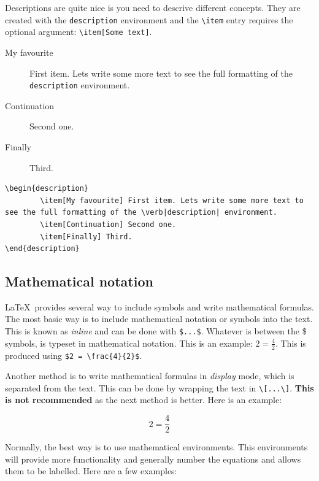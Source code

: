 Descriptions are quite nice is you need to descrive different concepts. They are created with the \verb|description| environment and the \verb|\item| entry requires the optional argument: \verb|\item[Some text]|.

\begin{description}
		\item[My favourite] First item. Lets write some more text to see the full formatting of the \verb|description| environment.
		\item[Continuation] Second one.
		\item[Finally] Third.
\end{description}

\begin{lstlisting}[language={[LaTeX]TeX}]
\begin{description}
		\item[My favourite] First item. Lets write some more text to see the full formatting of the \verb|description| environment.
		\item[Continuation] Second one.
		\item[Finally] Third.
\end{description}
\end{lstlisting}

\subsection{Mathematical notation}

\LaTeX\ provides several way to include symbols and write mathematical formulas. The most basic way is to include mathematical notation or symbols into the text. This is known as \emph{inline} and can be done with \verb|$...$|. Whatever is between the \$ symbols, is typeset in mathematical notation. This is an example: $2 = \frac{4}{2}$. This is produced using \verb|$2 = \frac{4}{2}$|.

Another method is to write mathematical formulas in \emph{display} mode, which is separated from the text. This can be done by wrapping the text in \verb|\[...\]|. \textbf{This is not recommended} as the next method is better. Here is an example:

\[
	2 = \frac{4}{2}
\]

Normally, the best way is to use mathematical environments. This environments will provide more functionality and generally number the equations and allows them to be labelled. Here are a few examples:


